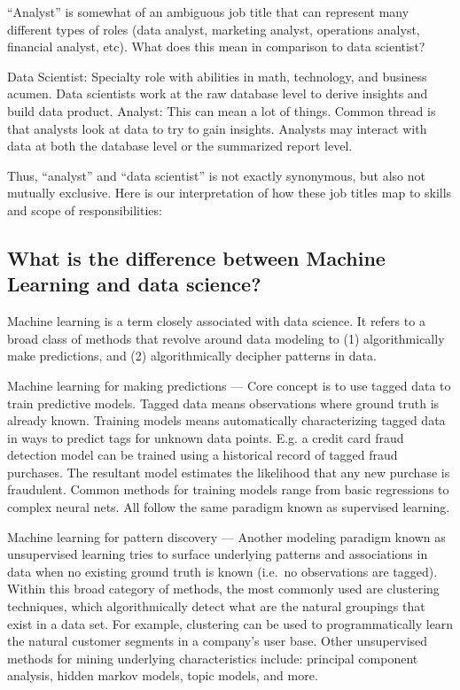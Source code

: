 \documentclass[
]{book}
\begin{document}
``Analyst'' is somewhat of an ambiguous job title that can represent many different types of roles (data analyst, marketing analyst, operations analyst, financial analyst, etc). What does this mean in comparison to data scientist?

Data Scientist: Specialty role with abilities in math, technology, and business acumen. Data scientists work at the raw database level to derive insights and build data product.
Analyst: This can mean a lot of things. Common thread is that analysts look at data to try to gain insights. Analysts may interact with data at both the database level or the summarized report level.

Thus, ``analyst'' and ``data scientist'' is not exactly synonymous, but also not mutually exclusive. Here is our interpretation of how these job titles map to skills and scope of responsibilities:

\hypertarget{what-is-the-difference-between-machine-learning-and-data-science}{%
\subsection{What is the difference between Machine Learning and data science?}\label{what-is-the-difference-between-machine-learning-and-data-science}}

Machine learning is a term closely associated with data science. It refers to a broad class of methods that revolve around data modeling to (1) algorithmically make predictions, and (2) algorithmically decipher patterns in data.

Machine learning for making predictions --- Core concept is to use tagged data to train predictive models. Tagged data means observations where ground truth is already known. Training models means automatically characterizing tagged data in ways to predict tags for unknown data points. E.g. a credit card fraud detection model can be trained using a historical record of tagged fraud purchases. The resultant model estimates the likelihood that any new purchase is fraudulent. Common methods for training models range from basic regressions to complex neural nets. All follow the same paradigm known as supervised learning.

Machine learning for pattern discovery --- Another modeling paradigm known as unsupervised learning tries to surface underlying patterns and associations in data when no existing ground truth is known (i.e.~no observations are tagged). Within this broad category of methods, the most commonly used are clustering techniques, which algorithmically detect what are the natural groupings that exist in a data set. For example, clustering can be used to programmatically learn the natural customer segments in a company's user base. Other unsupervised methods for mining underlying characteristics include: principal component analysis, hidden markov models, topic models, and more.
\end{document}
